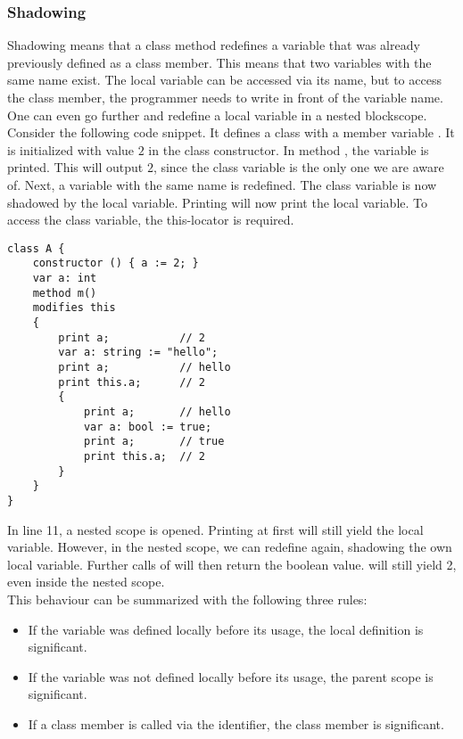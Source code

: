 \subsubsection{Shadowing}

Shadowing means that a class method redefines a variable that was already previously defined as a class member.
This means that two variables with the same name exist.
The local variable can be accessed via its name, but to access the class member, the programmer needs to write  in front of the variable name.\\

One can even go further and redefine a local variable in a nested blockscope.
Consider the following code snippet.
It defines a class with a member variable .
It is initialized with value $2$ in the class constructor.
In method , the variable  is printed.
This will output $2$, since the class variable is the only one we are aware of.
Next, a variable with the same name is redefined.
The class variable is now shadowed by the local variable.
Printing  will now print the local variable.
To access the class variable, the this-locator is required.

\begin{lstlisting}[language = dafny, caption={Complex Shadowing Example}, captionpos=b, label={lst:shadowing}]
class A {
    constructor () { a := 2; }
    var a: int
    method m()
    modifies this
    {
        print a;           // 2
        var a: string := "hello";
        print a;           // hello
        print this.a;      // 2
        {
            print a;       // hello
            var a: bool := true;
            print a;       // true
            print this.a;  // 2
        }
    }
}
\end{lstlisting}

In line 11, a nested scope is opened.
Printing  at first will still yield the local variable.
However, in the nested scope, we can redefine  again, shadowing the own local variable.
Further calls of  will then return the boolean value.
 will still yield 2, even inside the nested scope.\\

This behaviour can be summarized with the following three rules:
\begin{itemize}
    \item If the variable was defined locally before its usage, the local definition is significant.
    \item If the variable was not defined locally before its usage, the parent scope is significant.
    \item If a class member is called via the  identifier, the class member is significant.
\end{itemize}

